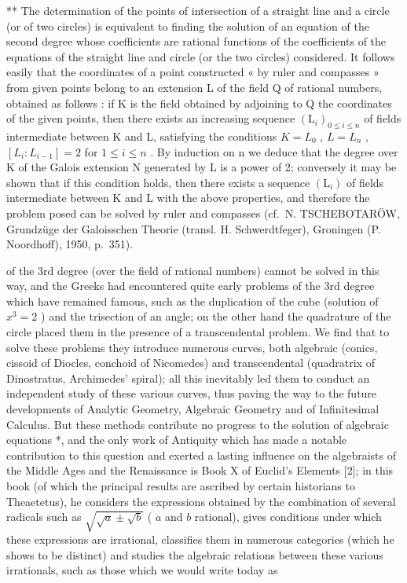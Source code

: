 ** The determination of the points of intersection of a straight line and a circle (or of two circles) is equivalent to finding the solution of an equation of the second degree whose coefficients are rational functions of the coefficients of the equations of the straight line and circle (or the two circles) considered. It follows easily that the coordinates of a point constructed « by ruler and compasses » from given points belong to an extension L of the field Q of rational numbers, obtained as follows : if K is the field obtained by adjoining to Q the coordinates of the given points, then there exists an increasing sequence \((\mathrm{L}_{i})_{0\leq i\leq n}\) of fields intermediate between K and L, satisfying the conditions \(K=L_{0}\) , \(L=L_{n}\) , \([L_{i}:L_{i-1}]=2\) for \(1\leq i\leq n\) . By induction on n we deduce that the degree over K of the Galois extension N generated by L is a power of 2; conversely it may be shown that if this condition holds, then there exists a sequence \((\mathrm{L}_{i})\) of fields intermediate between K and L with the above properties, and therefore the problem posed can be solved by ruler and compasses (cf.~N. TSCHEBOTARÖW, Grundzüge der Galoisschen Theorie (transl. H. Schwerdtfeger), Groningen (P. Noordhoff), 1950, p.~351).

of the 3rd degree (over the field of rational numbers) cannot be solved in this way, and the Greeks had encountered quite early problems of the 3rd degree which have remained famous, such as the duplication of the cube (solution of \(x^3 = 2\) ) and the trisection of an angle; on the other hand the quadrature of the circle placed them in the presence of a transcendental problem. We find that to solve these problems they introduce numerous curves, both algebraic (conics, cissoid of Diocles, conchoid of Nicomedes) and transcendental (quadratrix of Dinostratus, Archimedes' spiral); all this inevitably led them to conduct an independent study of these various curves, thus paving the way to the future developments of Analytic Geometry, Algebraic Geometry and of Infinitesimal Calculus. But these methods contribute no progress to the solution of algebraic equations *, and the only work of Antiquity which has made a notable contribution to this question and exerted a lasting influence on the algebraists of the Middle Ages and the Renaissance is Book X of Euclid's Elements {[}2{]}; in this book (of which the principal results are ascribed by certain historians to Theaetetus), he considers the expressions obtained by the combination of several radicals such as \(\sqrt{\sqrt{a} \pm \sqrt{b}}\) ( \(a\) and \(b\) rational), gives conditions under which these expressions are irrational, classifies them in numerous categories (which he shows to be distinct) and studies the algebraic relations between these various irrationals, such as those which we would write today as

